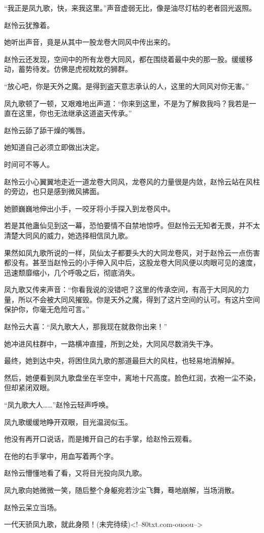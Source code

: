 \begin{this_body}
“我正是凤九歌，快，来我这里。”声音虚弱无比，像是油尽灯枯的老者回光返照。

赵怜云犹豫着。

她听出声音，竟是从其中一股龙卷大同风中传出来的。

赵怜云还发现，空间中的所有龙卷大同风，都在围绕着最中央的那一股。缓缓移动，蓄势待发。仿佛是虎视眈眈的狮群。

“放心吧，你是天外之魔。是得到盗天意志承认的人，这里的大同风对你无害。”

凤九歌顿了一顿，又艰难地出声道：“你来到这里，不是为了解救我吗？我若是一直在这里，你也无法继承这道盗天传承。”

赵怜云舔了舔干燥的嘴唇。

她知道自己必须立即做出决定。

时间可不等人。

赵怜云小心翼翼地走近一道龙卷大同风，龙卷风的力量很是内敛，赵怜云站在风柱的旁边，也只是感到微风拂面。

她颤巍巍地伸出小手，一咬牙将小手探入到龙卷风中。

若是其他蛊仙见到这一幕，恐怕要情不自禁地惊呼。但赵怜云无知者无畏，并不太清楚大同风的威力，她选择相信凤九歌。

果然如凤九歌所说的一样，凤仙太子都要头大的大同龙卷风，对于赵怜云一点伤害都没有。甚至当赵怜云的小手伸入风中后，这股龙卷大同风便以肉眼可见的速度，迅速颓靡缩小，几个呼吸之后，彻底消失。

凤九歌又传来声音：“你看我说的没错吧？这里的传承空间，有高于大同风的力量，所以不会被大同风摧毁。你是天外之魔，得到了这片空间的认可。有这片空间保护你，你毫无危险可言。”

赵怜云大喜：“凤九歌大人，那我现在就救你出来！”

她冲进风柱群中，一路横冲直撞，所到之处，大同风尽数消失干净。

最终，她到达中央，将困住凤九歌的那道最巨大的风柱，也轻易地消解掉。

然后，她便看到凤九歌盘坐在半空中，离地十尺高度。脸色红润，衣袍一尘不染，但却紧闭双眼。

“凤九歌大人……”赵怜云轻声呼唤。

凤九歌缓缓地睁开双眼，目光温润似玉。

他没有再开口说话，而是摊开自己的右手掌，给赵怜云观看。

在他的右手掌中，用血写着两个字。

赵怜云懵懂地看了看，又将目光投向凤九歌。

凤九歌向她微微一笑，随后整个身躯宛若沙尘飞舞，蓦地崩解，当场消散。

赵怜云呆立当场。

一代天骄凤九歌，就此身陨！(未完待续)<!--80txt.com-ouoou-->

\end{this_body}

